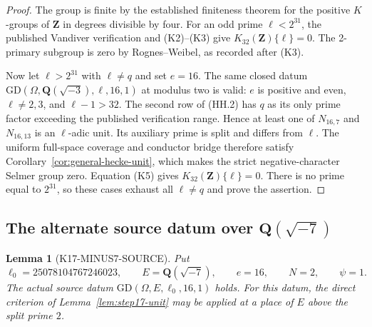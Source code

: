 \documentclass[11pt,a4paper]{article}
\newtheorem{lemma}[theorem]{Lemma}
\theoremstyle{definition}
\begin{document}
\begin{proof}
The group is finite by the established finiteness theorem for the
positive $K$-groups of $\mathbf Z$ in degrees divisible by four.
For an odd prime $\ell<2^{31}$, the published Vandiver verification
and (K2)--(K3) give $K_{32}(\mathbf Z)\{\ell\}=0$.
The 2-primary subgroup is zero by Rognes--Weibel, as recorded after
(K3).

Now let $\ell>2^{31}$ with $\ell\ne q$ and set $e=16$.
The same closed datum
$\mathrm{GD}(\Omega,\mathbf Q(\sqrt{-3}),\ell,16,1)$ at modulus two
is valid: $e$ is positive and even, $\ell\ne2,3$, and
$\ell-1>32$.
The second row of (HH.2) has $q$ as its only prime factor exceeding
the published verification range.
Hence at least one of $N_{16,7}$ and $N_{16,13}$ is an $\ell$-adic
unit. Its auxiliary prime is split and differs from $\ell$.
The uniform full-space coverage and conductor bridge therefore
satisfy Corollary~\ref{cor:general-hecke-unit}, which makes the
strict negative-character Selmer group zero.
Equation (K5) gives $K_{32}(\mathbf Z)\{\ell\}=0$.
There is no prime equal to $2^{31}$, so these cases exhaust all
$\ell\ne q$ and prove the assertion.
\end{proof}

\subsection{The alternate source datum over \(\mathbf Q(\sqrt{-7})\)}
\label{sec:minus7-source-coverage}

\begin{lemma}[K17-MINUS7-SOURCE]\label{lem:minus7-source}
Put
\[
 \ell_0=25078104767246023,\qquad E=\mathbf Q(\sqrt{-7}),
 \qquad e=16,\qquad N=2,\qquad\psi=1.
\]
The actual source datum \(\mathrm{GD}(\Omega,E,\ell_0,16,1)\) holds.
For this datum, the direct criterion of
Lemma~\ref{lem:step17-unit} may be applied at a place of \(E\) above
the split prime \(2\).
\end{lemma}
\end{document}

